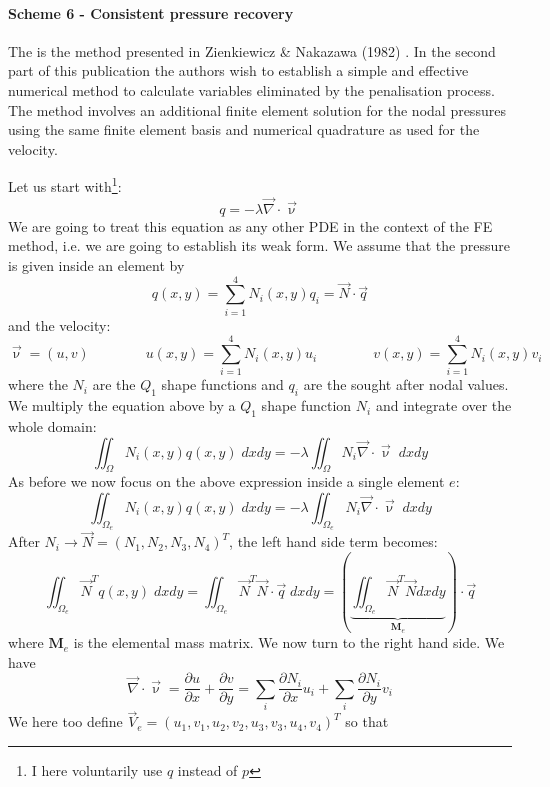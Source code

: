 \paragraph{Scheme 6 - Consistent pressure recovery}

The is the method presented in Zienkiewicz \& Nakazawa (1982) \cite{zina82}. In the second part 
of this publication the authors wish to establish a simple and effective numerical method to calculate 
variables eliminated by the penalisation process. 
The method involves an additional finite element solution for the nodal pressures using 
the same finite element basis and numerical quadrature as used for the velocity.

Let us start with\footnote{I here voluntarily use $q$ instead of $p$}:
\[
q = -\lambda \vec\nabla\cdot \vec\upnu
\]
We are going to treat this equation as any other PDE in the context of the FE method, i.e. 
we are going to establish its weak form. 
We assume that the pressure is given inside an element by
\[
q(x,y) = \sum_{i=1}^4 N_i(x,y) q_i = \vec{N} \cdot \vec{q}
\]
and the velocity:
\[
\vec\upnu = (u,v) 
\qquad 
\qquad 
u(x,y)  = \sum_{i=1}^4 N_i(x,y) u_i
\qquad 
\qquad 
v(x,y)  = \sum_{i=1}^4 N_i(x,y) v_i
\]
where the $N_i$ are the $Q_1$ shape functions and $q_i$ are the sought after nodal values. 
We multiply the equation above by a $Q_1$ shape function $N_i$ and integrate over the whole domain:
\[
\iint_\Omega N_i(x,y) q(x,y) \; dxdy = -\lambda \iint_\Omega N_i \vec\nabla\cdot \vec\upnu  \; dx dy
\]
As before we now focus on the above expression inside a single element $e$:
\[
\iint_{\Omega_e} N_i(x,y) q(x,y) \; dxdy = -\lambda \iint_{\Omega_e} N_i \vec\nabla\cdot \vec\upnu \; dx dy
\]
After $N_i \rightarrow \vec{N}=(N_1,N_2,N_3,N_4)^T$, the left hand side term becomes:
\[
\iint _{\Omega_e} \vec{N}^T q(x,y) \; dxdy 
=
\iint _{\Omega_e} \vec{N}^T \vec{N} \cdot \vec{q} \; dxdy 
=
\left(\underbrace{\iint _{\Omega_e} \vec{N}^T \vec{N} dxdy}_{{\bm M}_e} \right) \cdot \vec{q}  
\]
where ${\bm M}_e$ is the elemental mass matrix.
We now turn to the right hand side. We have
\[
\vec\nabla\cdot \vec\upnu
= \frac{\partial u}{\partial x}+\frac{\partial v}{\partial y}
= \sum_i \frac{\partial N_i}{\partial x} u_i + \sum_i \frac{\partial N_i}{\partial y} v_i 
\]
We here too define $\vec{V}_e=(u_1,v_1,u_2,v_2,u_3,v_3,u_4,v_4)^T$ so that 

